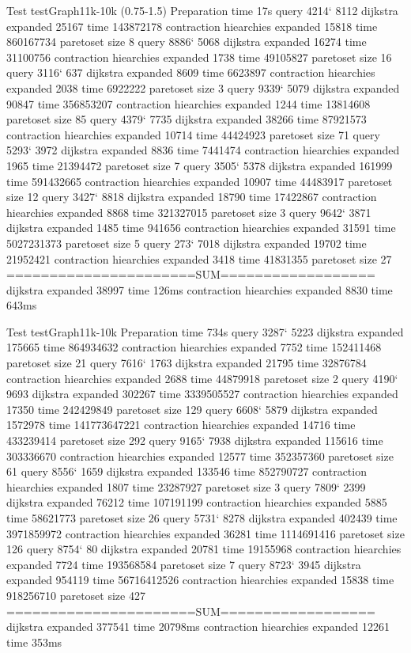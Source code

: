 Test testGraph11k-10k (0.75-1.5)
Preparation time 17s
query 4214` 8112
 dijkstra expanded 25167 time 143872178
 contraction hiearchies expanded 15818 time 860167734
 paretoset size 8
query 8886` 5068
 dijkstra expanded 16274 time 31100756
 contraction hiearchies expanded 1738 time 49105827
 paretoset size 16
query 3116` 637
 dijkstra expanded 8609 time 6623897
 contraction hiearchies expanded 2038 time 6922222
 paretoset size 3
query 9339` 5079
 dijkstra expanded 90847 time 356853207
 contraction hiearchies expanded 1244 time 13814608
 paretoset size 85
query 4379` 7735
 dijkstra expanded 38266 time 87921573
 contraction hiearchies expanded 10714 time 44424923
 paretoset size 71
query 5293` 3972
 dijkstra expanded 8836 time 7441474
 contraction hiearchies expanded 1965 time 21394472
 paretoset size 7
query 3505` 5378
 dijkstra expanded 161999 time 591432665
 contraction hiearchies expanded 10907 time 44483917
 paretoset size 12
query 3427` 8818
 dijkstra expanded 18790 time 17422867
 contraction hiearchies expanded 8868 time 321327015
 paretoset size 3
query 9642` 3871
 dijkstra expanded 1485 time 941656
 contraction hiearchies expanded 31591 time 5027231373
 paretoset size 5
query 273` 7018
 dijkstra expanded 19702 time 21952421
 contraction hiearchies expanded 3418 time 41831355
 paretoset size 27
======================SUM==================
dijkstra expanded 38997 time 126ms
contraction hiearchies expanded 8830 time 643ms

Test testGraph11k-10k
Preparation time 734s
query 3287` 5223
 dijkstra expanded 175665 time 864934632
 contraction hiearchies expanded 7752 time 152411468
 paretoset size 21
query 7616` 1763
 dijkstra expanded 21795 time 32876784
 contraction hiearchies expanded 2688 time 44879918
 paretoset size 2
query 4190` 9693
 dijkstra expanded 302267 time 3339505527
 contraction hiearchies expanded 17350 time 242429849
 paretoset size 129
query 6608` 5879
 dijkstra expanded 1572978 time 141773647221
 contraction hiearchies expanded 14716 time 433239414
 paretoset size 292
query 9165` 7938
 dijkstra expanded 115616 time 303336670
 contraction hiearchies expanded 12577 time 352357360
 paretoset size 61
query 8556` 1659
 dijkstra expanded 133546 time 852790727
 contraction hiearchies expanded 1807 time 23287927
 paretoset size 3
query 7809` 2399
 dijkstra expanded 76212 time 107191199
 contraction hiearchies expanded 5885 time 58621773
 paretoset size 26
query 5731` 8278
 dijkstra expanded 402439 time 3971859972
 contraction hiearchies expanded 36281 time 1114691416
 paretoset size 126
query 8754` 80
 dijkstra expanded 20781 time 19155968
 contraction hiearchies expanded 7724 time 193568584
 paretoset size 7
query 8723` 3945
 dijkstra expanded 954119 time 56716412526
 contraction hiearchies expanded 15838 time 918256710
 paretoset size 427
======================SUM==================
dijkstra expanded 377541 time 20798ms
contraction hiearchies expanded 12261 time 353ms

